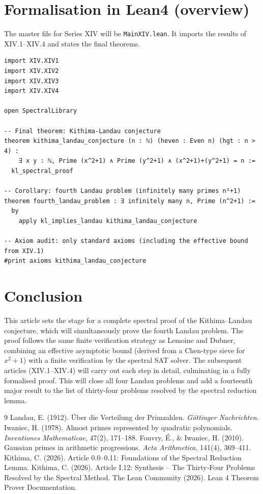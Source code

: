 \documentclass[11pt,a4paper]{article}
\begin{document}
\section{Formalisation in Lean4 (overview)}

The master file for Series XIV will be \texttt{MainXIV.lean}. It imports the results of XIV.1–XIV.4 and states the final theorems.

\begin{lstlisting}[style=lean, caption={MainXIV.lean (final)}]
import XIV.XIV1
import XIV.XIV2
import XIV.XIV3
import XIV.XIV4

open SpectralLibrary

-- Final theorem: Kithima‑Landau conjecture
theorem kithima_landau_conjecture (n : ℕ) (heven : Even n) (hgt : n > 4) :
    ∃ x y : ℕ, Prime (x^2+1) ∧ Prime (y^2+1) ∧ (x^2+1)+(y^2+1) = n :=
  kl_spectral_proof

-- Corollary: fourth Landau problem (infinitely many primes n²+1)
theorem fourth_landau_problem : ∃ infinitely many n, Prime (n^2+1) :=
  by
    apply kl_implies_landau kithima_landau_conjecture

-- Axiom audit: only standard axioms (including the effective bound from XIV.1)
#print axioms kithima_landau_conjecture
\end{lstlisting}

\section{Conclusion}

This article sets the stage for a complete spectral proof of the Kithima–Landau conjecture, which will simultaneously prove the fourth Landau problem. The proof follows the same finite verification strategy as Lemoine and Dubner, combining an effective asymptotic bound (derived from a Chen‑type sieve for \(x^2+1\)) with a finite verification by the spectral SAT solver. The subsequent articles (XIV.1–XIV.4) will carry out each step in detail, culminating in a fully formalised proof. This will close all four Landau problems and add a fourteenth major result to the list of thirty‑four problems resolved by the spectral reduction lemma.


\begin{thebibliography}{9}
  Landau, E. (1912). Über die Verteilung der Primzahlen. \emph{Göttinger Nachrichten}.
  Iwaniec, H. (1978). Almost primes represented by quadratic polynomials. \emph{Inventiones Mathematicae}, 47(2), 171–188.
  Fouvry, É., \& Iwaniec, H. (2010). Gaussian primes in arithmetic progressions. \emph{Acta Arithmetica}, 141(4), 369–411.
  Kithima, C. (2026). Article 0.0–0.11: Foundations of the Spectral Reduction Lemma.
  Kithima, C. (2026). Article I.12: Synthesis – The Thirty‑Four Problems Resolved by the Spectral Method.
  The Lean Community (2026). Lean 4 Theorem Prover Documentation.
\end{thebibliography}
\end{document}
